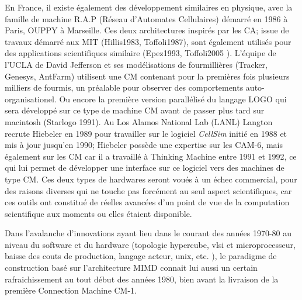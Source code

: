 En France, il existe également des développement similaires en physique, avec la famille de machine R.A.P (Réseau d’Automates Cellulaires) démarré en 1986 à Paris, OUPPY à Marseille. Ces deux architectures inspirés par les CA; issue de travaux démarré aux MIT (Hillis1983, Toffoli1987), sont également utilisés pour des applications scientifiques similaire (Epez1993, Toffoli2005 ). L’équipe de l’UCLA de David Jefferson et ses modélisations de fourmillières (Tracker, Genesys, AntFarm) utilisent une CM contenant pour la premières fois plusieurs milliers de fourmis, un préalable pour observer des comportements auto-organisationel. Ou encore la première version parallélisé du langage LOGO qui sera développé sur ce type de machine CM avant de passer plus tard sur macintosh (Starlogo 1991). Au Los Alamos National Lab (LANL) Langton recrute Hiebeler en 1989 pour travailler sur le logiciel \textit{CellSim} initié en 1988 et mis à jour jusqu’en 1990; Hiebeler possède une expertise sur les CAM-6, mais également sur les CM car il a travaillé à Thinking Machine entre 1991 et 1992, ce qui lui permet de développer une interface sur ce logiciel vers des machines de type CM. Ces deux types de hardwares seront voués à un échec commercial, pour des raisons diverses qui ne touche pas forcément au seul aspect scientifiques, car ces outils ont constitué de réelles avancées d’un point de vue de la computation scientifique aux moments ou elles étaient disponible.

Dans l'avalanche d'innovations ayant lieu dans le courant des années 1970-80 au niveau du software et du hardware (topologie hypercube, vlsi et microprocesseur, baisse des couts de production, langage acteur, unix, etc. ), le paradigme de construction basé sur l'architecture MIMD  connait lui aussi un certain rafraichissement au tout début des années 1980, bien avant la livraison de la première Connection Machine CM-1.

